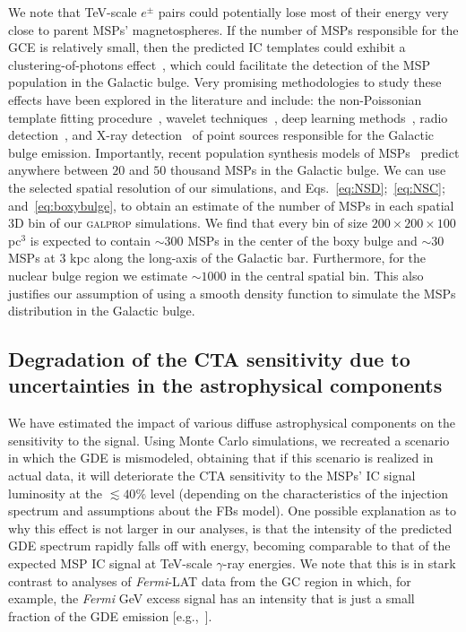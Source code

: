 \documentclass[doublespace,nopageskip]{VTthesis} %
\begin{document}
We note that TeV-scale $e^{\pm}$ pairs could potentially lose most of their energy very close to parent MSPs' magnetospheres. If the number of MSPs responsible for the GCE is relatively small, then the predicted IC templates could exhibit a clustering-of-photons effect~\citep{Acharyya:2020sbj}, which could facilitate the detection of the MSP population in the Galactic bulge.  Very promising methodologies to study these effects have been explored in the literature and include: the non-Poissonian template fitting procedure~\cite{Lee:2015fea,Leane:2019xiy,Chang:2019ars,Leane:2020pfc,Leane:2020nmi,Buschmann:2020adf}, wavelet techniques~\cite{Bartels:2015aea,Balaji:2018rwz,Zhong:2019ycb}, deep learning methods~\citep{Caron:2017udl,List:2020mzd}, radio detection~\citep{Calore:2015bsx,2015ApJ...805..172M,2017MNRAS.471..730R,2019ApJ...876...20H}, and X-ray detection~\citep{Berteaud:2020zef} of point sources responsible for the Galactic bulge emission.
%
Importantly, recent population synthesis models of MSPs~\citep{Ploeg:2020jeh} predict anywhere between $20$ and $50$ thousand MSPs in the Galactic bulge. We can use the selected spatial resolution of our simulations, and Eqs.~\ref{eq:NSD};~\ref{eq:NSC}; and~\ref{eq:boxybulge}, to obtain an estimate of the number of MSPs in each spatial 3D bin of our \textsc{galprop} simulations. We find that every bin of size $200\times200\times100$ pc$^3$ is expected to contain $\sim 300$ MSPs in the center of the boxy bulge and $\sim 30$ MSPs at 3 kpc along the long-axis of the Galactic bar. Furthermore, for the nuclear bulge region we estimate $\sim 1000$ in the central spatial bin.  This also justifies our assumption of using a smooth density function to simulate the MSPs distribution in the Galactic bulge. 



\subsection{Degradation of the CTA sensitivity due to uncertainties in the astrophysical components}

 We have estimated the impact of various diffuse astrophysical components on the sensitivity to the signal. Using Monte Carlo simulations, we recreated a scenario in which the GDE is mismodeled, obtaining that if this scenario is realized in actual data, it will deteriorate the CTA sensitivity to the MSPs' IC signal luminosity at the $\lesssim 40\%$ level (depending on the characteristics of the injection spectrum and assumptions about the FBs model). 
 One possible explanation as to why this effect is not larger in our analyses, is that the intensity of the predicted GDE spectrum rapidly falls off with energy, becoming comparable to that of the expected MSP IC signal at TeV-scale $\gamma$-ray energies. We note that this is in stark contrast to analyses of \textit{Fermi}-LAT data from the GC region in which, for example, the \textit{Fermi} GeV excess signal has an intensity that is just a small fraction of the GDE emission [e.g.,~\citet{Abazajian:2020tww}].
\end{document}
